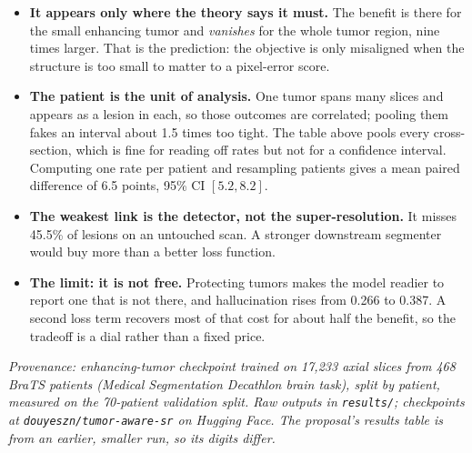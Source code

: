 \documentclass[11pt,a4paper]{article}
\begin{document}
\begin{itemize}
  \item \textbf{It appears only where the theory says it must.} The benefit is there for the
        small enhancing tumor and \emph{vanishes} for the whole tumor region, nine times
        larger. That is the prediction: the objective is only misaligned when the structure is
        too small to matter to a pixel-error score.
  \item \textbf{The patient is the unit of analysis.} One tumor spans many slices and appears
        as a lesion in each, so those outcomes are correlated; pooling them fakes an interval
        about 1.5 times too tight. The table above pools every cross-section, which is fine for
        reading off rates but not for a confidence interval. Computing one rate per patient and
        resampling patients gives a mean paired difference of 6.5 points, 95\% CI
        $[5.2, 8.2]$.
  \item \textbf{The weakest link is the detector, not the super-resolution.} It misses 45.5\% of
        lesions on an untouched scan. A stronger downstream segmenter would buy more than a
        better loss function.
  \item \textbf{The limit: it is not free.} Protecting tumors makes the model readier to report
        one that is not there, and hallucination rises from 0.266 to 0.387. A second loss term
        recovers most of that cost for about half the benefit, so the tradeoff is a dial rather
        than a fixed price.
\end{itemize}

\vspace{0.2em}
{\small\itshape Provenance: enhancing-tumor checkpoint trained on 17{,}233 axial slices from
468 BraTS patients (Medical Segmentation Decathlon brain task), split by patient, measured on
the 70-patient validation split. Raw outputs in \texttt{results/}; checkpoints at
\texttt{douyeszn/tumor-aware-sr} on Hugging Face. The proposal's results table is from an
earlier, smaller run, so its digits differ.}
\end{document}
